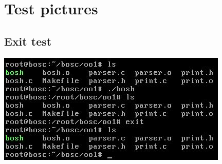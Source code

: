 \chapter{Test pictures}
\section{}
\label{Test2}

\section{}
\label{Test3}

\section{}
\label{Test4}

\section{}
\label{Test5}

\section{}
\label{Test6}

\section{Exit test}
\label{Test7}
\includegraphics{Images/TestOfPart7}
\section{}
\label{Test8}